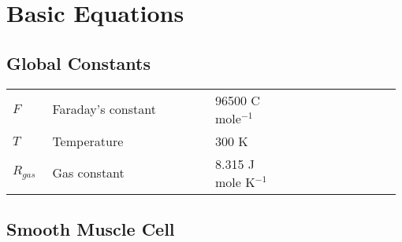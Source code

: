 \documentclass[fleqn]{report}
\numberwithin{equation}{section}
\numberwithin{equation}{section}
\begin{document}
 \chapter{Basic Equations}
 \section{\textbf{Global Constants}}\label{sec:equations}
 	\begin{table}[h!]
 		\centering
 			\begin{tabular}{ p{0.1\linewidth}  >{\footnotesize} p{0.41\linewidth}  >{\footnotesize} p{0.20\linewidth} >{\footnotesize} p{0.27\linewidth} }
 			\hline
 			$ F $				& Faraday's constant 	& 96500 C mole$^{-1}$ & 	\\
 			$ T $				& Temperature				& 300 K				 		&	\\
 			$ R_{gas} $	  & Gas constant				& 8.315 J mole K$^{-1}$ &  	\\
 
 			\hline
 		\end{tabular}
 	\end{table}
 		\section{Smooth Muscle Cell}
 	
\end{document}
